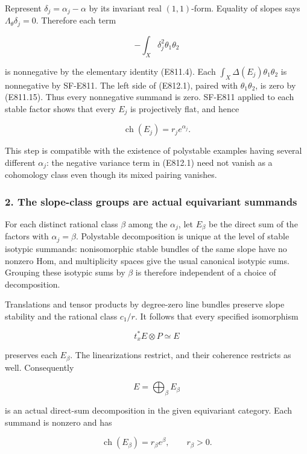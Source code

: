 Represent \(\delta_j=\alpha_j-\alpha\) by its invariant real
\((1,1)\)-form. Equality of slopes says \(\Lambda_\theta\delta_j=0\).
Therefore each term

\[
 -\int_X\delta_j^2\theta_1\theta_2
\]

is nonnegative by the elementary identity (E811.4). Each
\(\int_X\Delta(E_j)\theta_1\theta_2\) is nonnegative by SF-E811. The
left side of (E812.1), paired with \(\theta_1\theta_2\), is zero by
(E811.15). Thus every nonnegative summand is zero. SF-E811 applied to
each stable factor shows that every \(E_j\) is projectively flat, and
hence

\[
 \operatorname{ch}(E_j)=r_j e^{\alpha_j}.
 \tag{E812.2}
\]

This step is compatible with the existence of polystable examples having
several different \(\alpha_j\): the negative variance term in (E812.1)
need not vanish as a cohomology class even though its mixed pairing
vanishes.

\subsubsection{2. The slope-class groups are actual equivariant
summands}\label{the-slope-class-groups-are-actual-equivariant-summands}

For each distinct rational class \(\beta\) among the \(\alpha_j\), let
\(E_\beta\) be the direct sum of the factors with \(\alpha_j=\beta\).
Polystable decomposition is unique at the level of stable isotypic
summands: nonisomorphic stable bundles of the same slope have no nonzero
Hom, and multiplicity spaces give the usual canonical isotypic sums.
Grouping these isotypic sums by \(\beta\) is therefore independent of a
choice of decomposition.

Translations and tensor products by degree-zero line bundles preserve
slope stability and the rational class \(c_1/r\). It follows that every
specified isomorphism

\[
 t_x^*E\otimes P\simeq E
\]

preserves each \(E_\beta\). The linearizations restrict, and their
coherence restricts as well. Consequently

\[
 E=\bigoplus_\beta E_\beta
 \tag{E812.3}
\]

is an actual direct-sum decomposition in the given equivariant category.
Each summand is nonzero and has

\[
 \operatorname{ch}(E_\beta)=r_\beta e^\beta,
 \qquad r_\beta>0.
 \tag{E812.4}
\]

